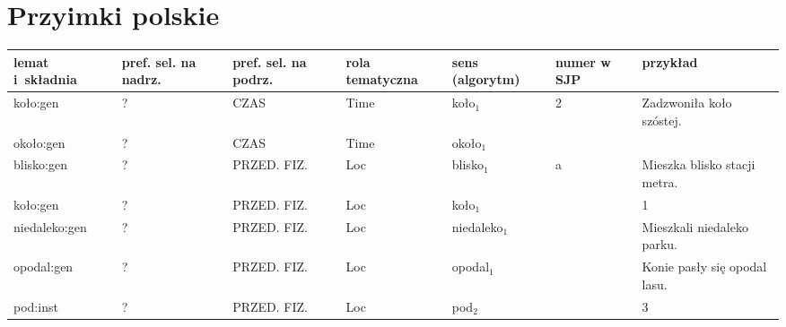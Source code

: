 \documentclass[a4paper, 12pt]{article}
\theoremstyle{remark}
\begin{document}
\section{Przyimki polskie} %
\label{sec:przyimki_polskie}

\begin{sidewaystable}
\centering
{%
\begin{tabular}{|p{2.5cm}|p{1.5cm}|p{2.5cm}|p{2cm}|p{2cm}|p{2cm}|p{10cm}|}
\hline
lemat i~składnia & pref. sel. na nadrz. & pref. sel. na podrz. & rola tematyczna    & sens (algorytm) & numer w SJP                & przykład                                                                                                                                  \\ \hline
koło:gen         & ?                    & CZAS                 & Time               & koło$_1$          & 2                          & Zadzwoniła koło szóstej.\\
około:gen        & ?                    & CZAS                 & Time               & około$_1$         &                            &                                                                                                                                           \\
blisko:gen       & ?                    & PRZED. FIZ.   & Loc                & blisko$_1$        & a                          & Mieszka blisko stacji metra.                                                                                                              \\
koło:gen         & ?                    & PRZED. FIZ.   & Loc                & koło$_1$          &                            & 1                                                                                                                                         \\
niedaleko:gen    & ?                    & PRZED. FIZ.   & Loc                & niedaleko$_1$     &                            & Mieszkali niedaleko parku.                                                                                                                \\
opodal:gen       & ?                    & PRZED. FIZ.   & Loc                & opodal$_1$        &                            & Konie pasły się opodal lasu.                                                                                                              \\
pod:inst         & ?                    & PRZED. FIZ.   & Loc                & pod$_2$           &                            & 3                                                                                                                                         \\

\end{tabular}}
\end{sidewaystable}
\end{document}
